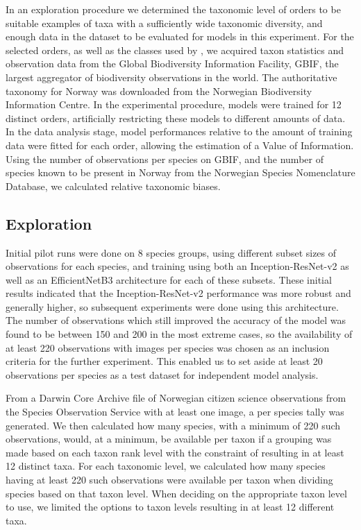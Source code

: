 \documentclass{article}
\begin{document}
In an exploration procedure we determined the taxonomic level of orders to be suitable examples of taxa with a sufficiently wide taxonomic diversity, and enough data in the dataset to be evaluated for models in this experiment. For the selected orders, as well as the classes used by \citeauthor{Troudet2017}\autocite{Troudet2017}, we acquired taxon statistics and observation data from the Global Biodiversity Information Facility, GBIF, the largest aggregator of biodiversity observations in the world\autocite{GBIFhomepage}. The authoritative taxonomy for Norway was downloaded from the Norwegian Biodiversity Information Centre. In the experimental procedure, models were trained for 12 distinct orders, artificially restricting these models to different amounts of data. In the data analysis stage, model performances relative to the amount of training data were fitted for each order, allowing the estimation of a Value of Information. Using the number of observations per species on GBIF, and the number of species known to be present in Norway from the Norwegian Species Nomenclature Database, we calculated relative taxonomic biases.


\subsection*{Exploration}
Initial pilot runs were done on 8 species groups, using different subset sizes of observations for each species, and training using both an Inception-ResNet-v2\autocite{szegedy2016inceptionv4} as well as an EfficientNetB3\autocite{tan2020efficientnet} architecture for each of these subsets. These initial results indicated that the Inception-ResNet-v2 performance was more robust and generally higher, so subsequent experiments were done using this architecture. The number of observations which still improved the accuracy of the model was found to be between 150 and 200 in the most extreme cases, so the availability of at least 220 observations with images per species was chosen as an inclusion criteria for the further experiment. This enabled us to set aside at least 20 observations per species as a test dataset for independent model analysis.

From a Darwin Core Archive file of Norwegian citizen science observations from the Species Observation Service with at least one image\autocite{GBIF_dataset}, a per species tally was generated. We then calculated how many species, with a minimum of 220 such observations, would, at a minimum, be available per taxon if a grouping was made based on each taxon rank level with the constraint of resulting in at least 12 distinct taxa. For each taxonomic level, we calculated how many species having at least 220 such observations were available per taxon when dividing species based on that taxon level. When deciding on the appropriate taxon level to use, we limited the options to taxon levels resulting in at least 12 different taxa.
\end{document}

